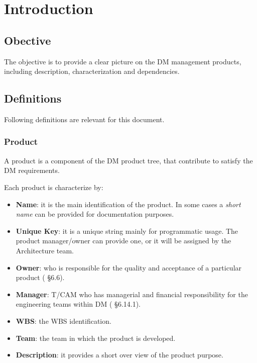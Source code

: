 \section{Introduction}


\subsection{Obective}

The objective is to provide a clear picture on the DM management products, including description, characterization and dependencies.


\subsection{Definitions}

Following definitions are relevant for this document.


\subsubsection{Product} \label{sec:product}

A product is a component of the DM product tree, that contribute to satisfy the DM requirements.

Each product is characterize by:

\begin{itemize}
\item \textbf{Name}: it is the main identification of the product. In some cases a \textit{short name} can be provided for documentation purposes.
\item \textbf{Unique Key}: it is a unique string mainly for programmatic usage. The product manager/owner can provide one, or it will be assigned by the Architecture team.
\item \textbf{Owner}: who is responsible for the quality and acceptance of a particular product ( \S6.6).
\item \textbf{Manager}: {T/CAM} who has managerial and financial responsibility for the engineering teams within DM ( \S6.14.1).
\item \textbf{WBS}: the WBS identification.
\item \textbf{Team}: the team in which the product is developed.
\item \textbf{Description}: it provides a short over view of the product purpose.
\end{itemize}


